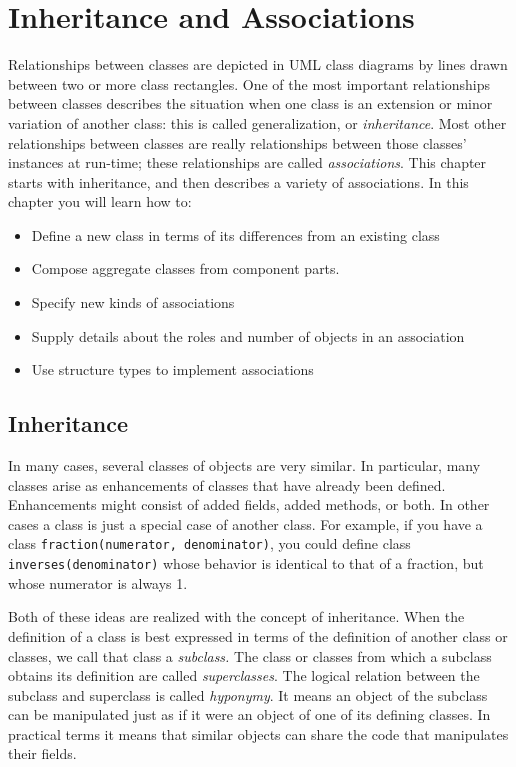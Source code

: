 \chapter{Inheritance and Associations}

Relationships between classes are depicted in UML class diagrams by
lines drawn between two or more class rectangles. One of the most
important relationships between classes describes the situation when
one class is an extension or minor variation of another class: this is
called generalization, or \textit{inheritance}. Most other
relationships between classes are really relationships between those
classes' instances at run-time; these
relationships are called \textit{associations}. This chapter starts
with inheritance, and then describes a variety of associations.
In this chapter you will learn how to:
\begin{itemize}\itemsep0pt
  \item Define a new class in terms of its differences from an existing class
  \item Compose aggregate classes from component parts.
  \item Specify new kinds of associations
  \item Supply details about the roles and number of objects in an association
  \item Use structure types to implement associations
\end{itemize}

\section{Inheritance}

In many cases, several classes of objects are very similar. In
particular, many classes arise as enhancements of classes that have
already been defined. Enhancements might consist of added fields, added
methods, or both. In other cases a class is just a special case of
another class. For example, if you have a class
\texttt{fraction(numerator, denominator)}, you could define class
\texttt{inverses(denominator)} whose behavior is identical to that of a
fraction, but whose numerator is always 1. 

Both of these ideas are realized with the concept of
inheritance. When the definition of a class is best
expressed in terms of the definition of another class or classes, we
call that class a \textit{subclass.} The class or
classes from which a subclass obtains its definition are called
\textit{superclass}\textit{es}. The logical relation
between the subclass and superclass is called \textit{hyponymy}. It
means an object of the subclass can be manipulated just as if it were
an object of one of its defining classes. In practical terms it means
that similar objects can share the code that manipulates their fields.

